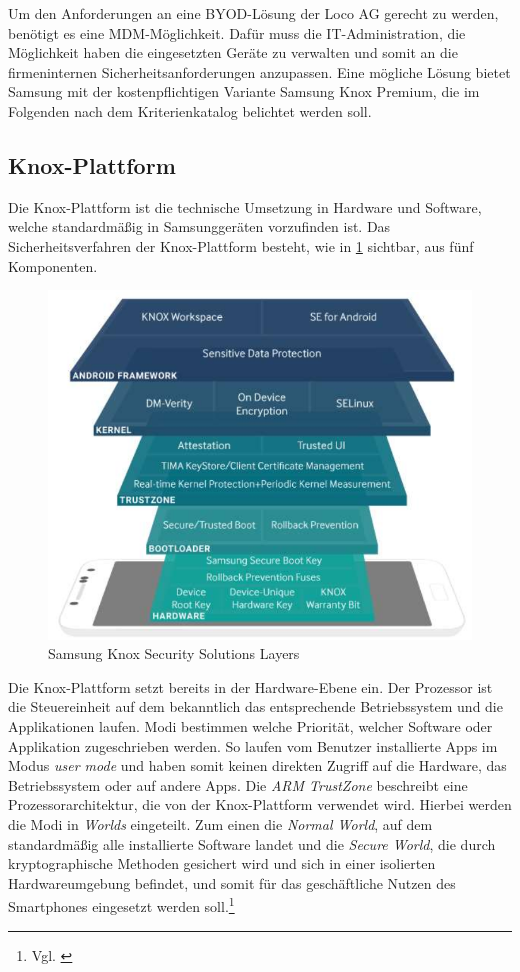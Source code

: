 Um den Anforderungen an eine BYOD-Lösung der Loco AG gerecht zu werden, benötigt es eine MDM-Möglichkeit. Dafür muss die IT-Administration, die Möglichkeit haben die eingesetzten Geräte zu verwalten und somit an die firmeninternen Sicherheitsanforderungen anzupassen. Eine mögliche Lösung bietet Samsung mit der kostenpflichtigen Variante Samsung Knox Premium, die im Folgenden nach dem Kriterienkatalog belichtet werden soll. 

\subsection{Knox-Plattform}
Die Knox-Plattform ist die technische Umsetzung in Hardware und Software, welche standardmäßig in Samsunggeräten vorzufinden ist. Das Sicherheitsverfahren der Knox-Plattform besteht, wie in \cref{fig:SamKno1} sichtbar, aus fünf Komponenten.
\begin{figure}[hbt]
\centering
\includegraphics[width=1\textwidth]{Bilder/sk_1}
\caption{Samsung Knox Security Solutions Layers}\label{fig:SamKno1}
\end{figure}
Die Knox-Plattform setzt bereits in der Hardware-Ebene ein. Der Prozessor ist die Steuereinheit auf dem bekanntlich das entsprechende Betriebssystem und die Applikationen laufen. Modi bestimmen welche Priorität, welcher Software oder Applikation zugeschrieben werden. So laufen vom Benutzer installierte Apps im Modus \textit{user mode} und haben somit keinen direkten Zugriff auf die Hardware, das Betriebssystem oder auf andere Apps. Die \textit{ARM TrustZone} beschreibt eine Prozessorarchitektur, die von der Knox-Plattform verwendet wird. Hierbei werden die Modi in \textit{Worlds} eingeteilt. Zum einen die \textit{Normal World}, auf dem standardmäßig alle installierte Software landet und die \textit{Secure World}, die durch kryptographische Methoden gesichert wird und sich in einer isolierten Hardwareumgebung befindet, und somit für das geschäftliche Nutzen des Smartphones eingesetzt werden soll.\footnote{Vgl. \cite{sam2017c}}

